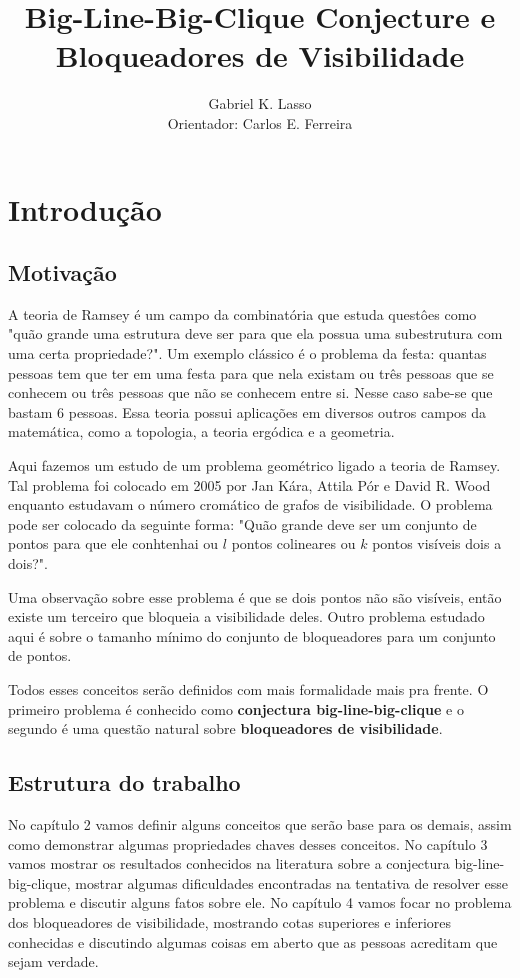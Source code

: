 \documentclass[a4paper]{book}
\title{\textbf{Big-Line-Big-Clique Conjecture e Bloqueadores de Visibilidade}}
\author{Gabriel K. Lasso\\ Orientador: Carlos E. Ferreira}
\date{}
\begin{document}
\maketitle
\tableofcontents
\chapter{Introdução}

\section{Motivação}
A teoria de Ramsey é um campo da combinatória que estuda questôes como "quão grande uma estrutura deve ser para que ela possua uma subestrutura com uma certa propriedade?". Um exemplo clássico é o problema da festa: quantas pessoas tem que ter em uma festa para que nela existam ou três pessoas que se conhecem ou três pessoas que não se conhecem entre si. Nesse caso sabe-se que bastam 6 pessoas. Essa teoria possui aplicações em diversos outros campos da matemática, como a topologia, a teoria ergódica e a geometria.\cite{ES}

Aqui fazemos um estudo de um problema geométrico ligado a teoria de Ramsey. Tal problema foi colocado em 2005 por Jan Kára, Attila Pór e David R. Wood enquanto estudavam o número cromático de grafos de visibilidade. O problema pode ser colocado da seguinte forma: "Quão grande deve ser um conjunto de pontos para que ele conhtenhai ou $l$ pontos colineares ou $k$ pontos visíveis dois a dois?".

Uma observação sobre esse problema é que se dois pontos não são visíveis, então existe um terceiro que bloqueia a visibilidade deles. Outro problema estudado aqui é sobre o tamanho mínimo do conjunto de bloqueadores para um conjunto de pontos.

Todos esses conceitos serão definidos com mais formalidade mais pra frente. O primeiro problema é conhecido como \textbf{conjectura big-line-big-clique} e o segundo é uma questão natural sobre \textbf{bloqueadores de visibilidade}.

\section{Estrutura do trabalho}
No capítulo 2 vamos definir alguns conceitos que serão base para os demais, assim como demonstrar algumas propriedades chaves desses conceitos. No capítulo 3 vamos mostrar os resultados conhecidos na literatura sobre a conjectura big-line-big-clique, mostrar algumas dificuldades encontradas na tentativa de resolver esse problema e discutir alguns fatos sobre ele. No capítulo 4 vamos focar no problema dos bloqueadores de visibilidade, mostrando cotas superiores e inferiores conhecidas e discutindo algumas coisas em aberto que as pessoas acreditam que sejam verdade.
\end{document}
